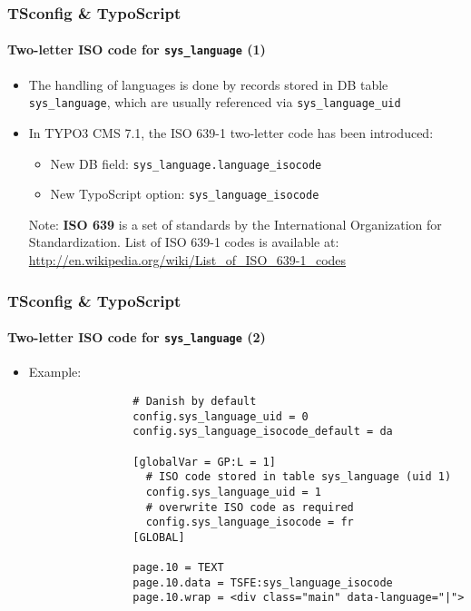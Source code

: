 \begin{frame}[fragile]
	\frametitle{TSconfig \& TypoScript}
	\framesubtitle{Two-letter ISO code for \texttt{sys\_language} (1)}

	\begin{itemize}
		\item The handling of languages is done by records stored in DB table
			\texttt{sys\_language}, which are usually referenced via \texttt{sys\_language\_uid}
		\item In TYPO3 CMS 7.1, the ISO 639-1 two-letter code has been introduced:

			\begin{itemize}
				\item New DB field: \texttt{sys\_language.language\_isocode}
				\item New TypoScript option: \texttt{sys\_language\_isocode}
			\end{itemize}


		\vspace{1cm}

		\small
			Note: \textbf{ISO 639} is a set of standards by the International Organization
			for Standardization. List of ISO 639-1 codes is available at:\newline
			\url{http://en.wikipedia.org/wiki/List_of_ISO_639-1_codes}
		\normalsize

	\end{itemize}

\end{frame}


\begin{frame}[fragile]
	\frametitle{TSconfig \& TypoScript}
	\framesubtitle{Two-letter ISO code for \texttt{sys\_language} (2)}

	\begin{itemize}
		\item Example:

			\begin{lstlisting}
				# Danish by default
				config.sys_language_uid = 0
				config.sys_language_isocode_default = da

				[globalVar = GP:L = 1]
				  # ISO code stored in table sys_language (uid 1)
				  config.sys_language_uid = 1
				  # overwrite ISO code as required
				  config.sys_language_isocode = fr
				[GLOBAL]

				page.10 = TEXT
				page.10.data = TSFE:sys_language_isocode
				page.10.wrap = <div class="main" data-language="|">
			\end{lstlisting}

	\end{itemize}

\end{frame}

